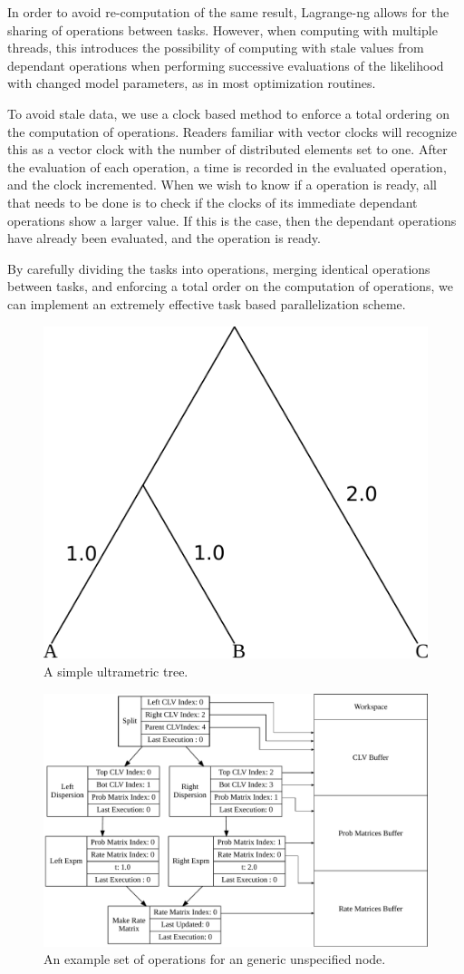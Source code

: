 \documentclass{article}
\begin{document}
In order to avoid re-computation of the same result, Lagrange-ng allows for the sharing of operations between tasks.
However, when computing with multiple threads, this introduces the possibility of computing with stale values from
dependant operations when performing successive evaluations of the likelihood with changed model parameters, as in most
optimization routines.

To avoid stale data, we use a clock based method to enforce a total ordering on the computation of operations. Readers
familiar with vector clocks will recognize this as a vector clock with the number of distributed elements set to one.
After the evaluation of each operation, a time is recorded in the evaluated operation, and the clock incremented. When
we wish to know if a operation is ready, all that needs to be done is to check if the clocks of its immediate dependant
operations show a larger value. If this is the case, then the dependant operations have already been evaluated, and the
operation is ready.

By carefully dividing the tasks into operations, merging identical operations between tasks, and enforcing a total order
on the computation of operations, we can implement an extremely effective task based parallelization scheme.

\begin{figure}
  \centering
  \includegraphics[width=.5\linewidth]{figures/simple-tree-ultrametric.pdf}
  \caption{A simple ultrametric tree.}
  \label{fig:ultra}
\end{figure}

\begin{figure}
  \centering
  \includegraphics[width=\linewidth]{figures/simple-operations.pdf}
  \caption{An example set of operations for an generic unspecified node.}
  \label{fig:simple-operations}
\end{figure}
\end{document}
